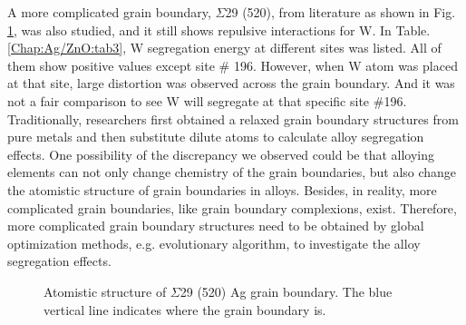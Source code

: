 A more complicated grain boundary, $\Sigma$29 (520), from literature \cite{zhu2018predicting} as shown in Fig. \ref{Chap:Ag/ZnO:fig20}, was also studied, and it still shows repulsive interactions for W. In Table. \ref{Chap:Ag/ZnO:tab3}, W segregation energy at different sites was listed. All of them show positive values except site \# 196. However, when W atom was placed at that site, large distortion was observed across the grain boundary. And it was not a fair comparison to see W will segregate at that specific site \#196.  Traditionally, researchers first obtained a relaxed grain boundary structures from pure metals and then substitute dilute atoms to calculate alloy segregation effects. One possibility of the discrepancy we observed could be that alloying elements can not only change chemistry of the grain boundaries, but also change the atomistic structure of grain boundaries in alloys. Besides, in reality, more complicated grain boundaries, like grain boundary complexions, exist. \cite{cantwell2014grain} Therefore, more complicated grain boundary structures need to be obtained by global optimization methods, e.g. evolutionary algorithm, to investigate the alloy segregation effects.


\begingroup
\begin{figure}[!ht]
  \centering
  \caption[Atomistic structure of $\Sigma$29 (520) Ag grain boundary.]{Atomistic structure of $\Sigma$29 (520) Ag grain boundary. The blue vertical line indicates where the grain boundary is.}
  \label{Chap:Ag/ZnO:fig20}
\end{figure}
\endgroup


